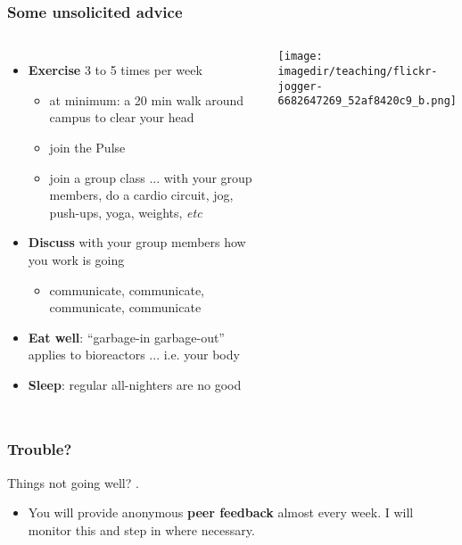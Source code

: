 \begin{frame}\frametitle{Some unsolicited advice}
	\begin{columns}[c]
			
			\begin{itemize}
				\item	\textbf{Exercise} 3 to 5 times per week
				\begin{itemize}
					\item	at minimum: a 20 min walk around campus to clear your head
					\item	join the Pulse
					\item	join a group class ... with your group members, do a cardio circuit, jog, push-ups, yoga, weights, \emph{etc}
				\end{itemize}
				\pause
				\item	\textbf{Discuss} with your group members how you work is going
				\begin{itemize}
					\item	communicate, communicate, communicate, communicate
				\end{itemize}
				\item	\textbf{Eat well}: ``garbage-in garbage-out'' applies to bioreactors ... i.e. your body
				\item	\textbf{Sleep}: regular all-nighters are no good
			\end{itemize}
			
			\centerline{\texttt{[image: \\imagedir/teaching/flickr-jogger-6682647269\_52af8420c9\_b.png]}}
			
	\end{columns}

	
\end{frame}

\begin{frame}\frametitle{Trouble?}
	\begin{exampleblock}{}
		\vspace{12pt}
		Things not going well? {}.
		\vspace{12pt}
	\end{exampleblock}
	\begin{itemize}
		\item	You will provide anonymous \textbf{peer feedback} almost every week. I will monitor this and step in where necessary.
	\end{itemize}
\end{frame}

